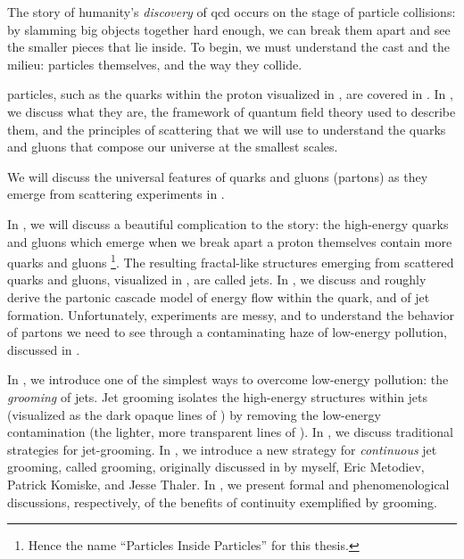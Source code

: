 The story of humanity's \textit{discovery} of \gls{qcd} occurs on the stage of particle collisions:
%
by slamming big objects together hard enough, we can break them apart and see the smaller pieces that lie inside.
%
To begin, we must understand the cast and the milieu:
%
particles themselves, and the way they collide.


\Glspl{particle}, such as the quarks within the proton visualized in , are covered in .
%
In , we discuss what they are, the framework of quantum field theory used to describe them, and the principles of scattering that we will use to understand the quarks and gluons that compose our universe at the smallest scales.

We will discuss the universal features of quarks and gluons (partons) as they emerge from scattering experiments in .



In , we will discuss a beautiful complication to the story:
%
the high-energy quarks and gluons which emerge when we break apart a proton themselves contain more quarks and gluons%
\footnote{
    Hence the name ``Particles Inside Particles'' for this thesis.
}.
%
The resulting fractal-like structures emerging from scattered quarks and gluons, visualized in , are called \glspl{jet}.
%
In , we discuss and roughly derive the partonic cascade model of energy flow within the quark, and of jet formation.
%
Unfortunately, experiments are messy, and to understand the behavior of partons we need to see through a contaminating haze of low-energy pollution, discussed in .



In , we introduce one of the simplest ways to overcome low-energy pollution:
%
the \textit{grooming} of jets.
%
Jet grooming isolates the high-energy structures within jets (visualized as the dark opaque lines of ) by removing the low-energy contamination (the lighter, more transparent lines of ).
%
In , we discuss traditional strategies for \gls{jet-grooming}.
%
In , we introduce a new strategy for \textit{continuous} jet grooming, called \PIRANHA{} grooming, originally discussed in  by myself, Eric Metodiev, Patrick Komiske, and Jesse Thaler.
%
In , we present formal and phenomenological discussions, respectively, of the benefits of continuity exemplified by \PIRANHA{} grooming.




